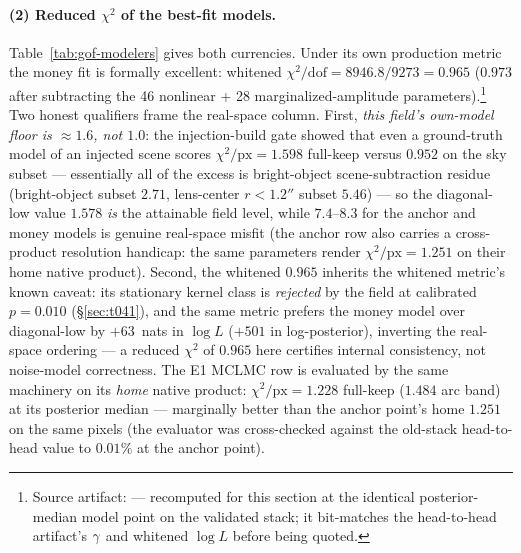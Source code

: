 \paragraph{(2) Reduced $\chi^2$ of the best-fit models.}
Table~\ref{tab:gof-modelers} gives both currencies. Under its own
production metric the money fit is formally excellent: whitened
$\chi^2/\mathrm{dof} = 8946.8/9273 = 0.965$ ($0.973$ after subtracting the
46 nonlinear + 28 marginalized-amplitude
parameters).\footnote{Source artifact:
 --- recomputed for this
section at the identical posterior-median model point on the validated
stack; it bit-matches the head-to-head artifact's $\gamma$ and whitened
$\log L$ before being quoted.}
Two honest qualifiers frame the real-space column. First, \emph{this
field's own-model floor is $\approx1.6$, not $1.0$}: the injection-build
gate showed that even a ground-truth model of an injected scene scores
$\chi^2/\mathrm{px}=1.598$ full-keep versus $0.952$ on the sky subset ---
essentially all of the excess is bright-object scene-subtraction residue
(bright-object subset $2.71$, lens-center $r<1.2''$ subset
$5.46$) --- so the diagonal-low value
$1.578$ \emph{is} the attainable field level, while $7.4$--$8.3$ for the
anchor and money models is genuine real-space misfit (the anchor row also
carries a cross-product resolution handicap: the same parameters render
$\chi^2/\mathrm{px}=1.251$ on their home native product). Second, the
whitened $0.965$ inherits the whitened metric's known caveat: its
stationary kernel class is \emph{rejected} by the field at calibrated
$p=0.010$ (\S\ref{sec:t041}), and the same metric prefers the money model
over diagonal-low by $+63$~nats in $\log L$ ($+501$ in log-posterior),
inverting the real-space ordering --- a reduced $\chi^2$ of $0.965$ here
certifies internal consistency, not noise-model correctness. The E1 MCLMC
row is evaluated by the same machinery on its \emph{home} native product:
$\chi^2/\mathrm{px}=1.228$ full-keep ($1.484$ arc band) at its posterior
median --- marginally better than the anchor point's home $1.251$ on the
same pixels (the evaluator was cross-checked against the old-stack
head-to-head value to $0.01\%$ at the anchor
point).

